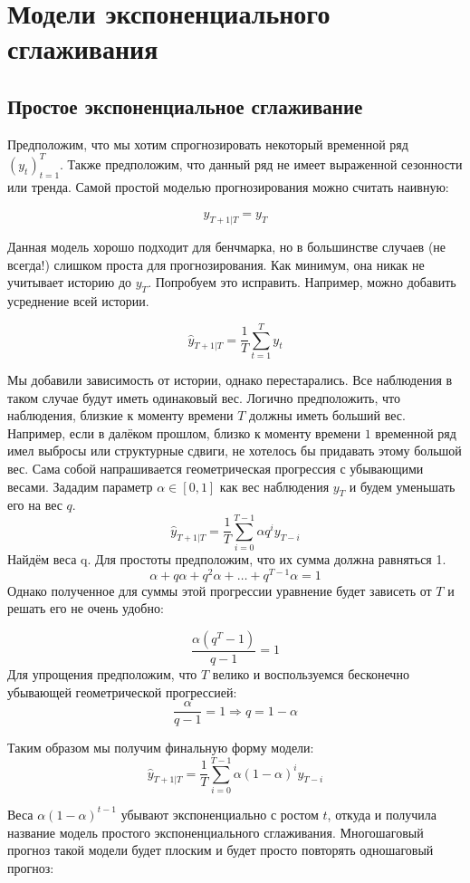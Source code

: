 \documentclass[12pt,fleqn]{article}
\begin{document}
\section{Модели экспоненциального сглаживания}

\subsection{Простое экспоненциальное сглаживание}

Предположим, что мы хотим спрогнозировать некоторый временной ряд $(y_t)_{t=1}^{T}$. Также предположим, что данный ряд не имеет выраженной сезонности или тренда. Самой простой моделью прогнозирования можно считать наивную:

$$
\hat{y}_{T+1|T} = y_T
$$

Данная модель хорошо подходит для бенчмарка, но в большинстве случаев (не всегда!) слишком проста для прогнозирования. Как минимум, она никак не учитывает историю до $y_T$. Попробуем это исправить. Например, можно добавить усреднение всей истории.


$$
\hat{y}_{T+1|T} = \frac{1}{T}\sum_{t=1}^{T}y_t
$$

Мы добавили зависимость от истории, однако перестарались. Все наблюдения в таком случае будут иметь одинаковый вес. Логично предположить, что наблюдения, близкие к моменту времени $T$ должны иметь больший вес. Например, если в далёком прошлом, близко к моменту времени $1$ временной ряд имел выбросы или структурные сдвиги, не хотелось бы придавать этому большой вес. Сама собой напрашивается геометрическая прогрессия с убывающими весами. Зададим параметр $\alpha \in [0, 1]$ как вес наблюдения $y_T$ и будем уменьшать его на вес $q$.
$$
\hat{y}_{T+1|T} = \frac{1}{T}\sum_{i=0}^{T-1} \alpha q^{i} y_{T-i}
$$
Найдём веса q. Для простоты предположим, что их сумма должна равняться 1. 
$$
\alpha + q \alpha + q^2 \alpha + \ldots + q^{T-1} \alpha = 1
$$
Однако полученное для суммы этой прогрессии уравнение будет  зависеть от $T$ и решать его не очень удобно:

$$
\frac{\alpha(q^T - 1)}{q-1} = 1
$$
Для упрощения предположим, что $T$ велико и воспользуемся бесконечно убывающей геометрической прогрессией:
$$
\frac{\alpha}{q-1} = 1 \Rightarrow q = 1-\alpha
$$

Таким образом мы получим финальную форму модели:
$$
\hat{y}_{T+1|T} = \frac{1}{T}\sum_{i=0}^{T-1} \alpha (1-\alpha)^{i} y_{T-i}
$$

Веса $ \alpha (1-\alpha)^{t-1} $ убывают экспоненциально с ростом $t$, откуда и получила название модель простого экспоненциального сглаживания. Многошаговый прогноз такой модели будет плоским и будет просто повторять одношаговый прогноз:
\end{document}
